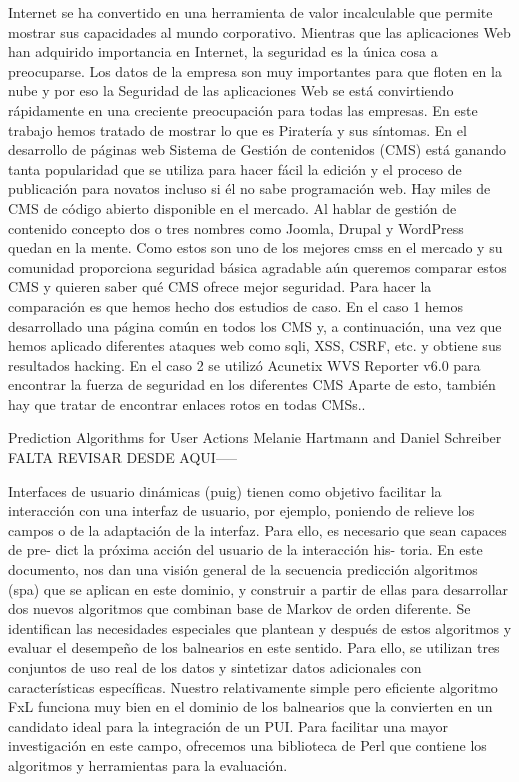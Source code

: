 Internet se ha convertido en una herramienta de  valor incalculable  que permite mostrar sus capacidades al mundo corporativo. Mientras que las aplicaciones Web han adquirido importancia en  Internet, la seguridad es la única cosa a preocuparse. Los datos de la empresa son muy importantes para que floten en la nube y por eso la Seguridad de las aplicaciones Web se está convirtiendo rápidamente en una creciente preocupación para todas las empresas. En este trabajo hemos tratado de mostrar lo que es Piratería y sus síntomas. En el desarrollo de páginas web Sistema de Gestión de contenidos (CMS) está ganando tanta popularidad que se utiliza para hacer fácil la edición y el proceso de publicación para novatos incluso si él no sabe programación web. Hay miles de CMS de código abierto disponible en el mercado. Al hablar de gestión de contenido concepto dos o tres nombres como Joomla, Drupal y WordPress quedan en la mente. Como estos son uno de los mejores cmss en el mercado y su comunidad proporciona seguridad básica agradable aún queremos comparar estos CMS y quieren saber qué CMS ofrece mejor seguridad. Para hacer la comparación es que hemos hecho dos estudios de caso. En el caso 1 hemos desarrollado una página común en todos los CMS y, a continuación, una vez que hemos aplicado diferentes ataques web como sqli, XSS, CSRF, etc. y obtiene sus resultados hacking. En el caso 2 se utilizó Acunetix WVS Reporter v6.0 para encontrar la fuerza de seguridad en los diferentes CMS Aparte de esto, también hay que tratar de encontrar enlaces rotos en todas CMSs..


Prediction Algorithms for User Actions
Melanie Hartmann and Daniel Schreiber
FALTA REVISAR DESDE AQUI-----

Interfaces de usuario dinámicas (puig) tienen como objetivo facilitar la interacción con una interfaz de usuario, por ejemplo, poniendo de relieve los campos o de la adaptación de la interfaz. Para ello, es necesario que sean capaces de pre- dict la próxima acción del usuario de la interacción his- toria. En este documento, nos dan una visión general de la secuencia predicción algoritmos (spa) que se aplican en este dominio, y construir a partir de ellas para desarrollar dos nuevos algoritmos que combinan base de Markov de orden diferente. Se identifican las necesidades especiales que plantean y después de estos algoritmos y evaluar el desempeño de los balnearios en este sentido. Para ello, se utilizan tres conjuntos de uso real de los datos y sintetizar datos adicionales con características específicas. Nuestro relativamente simple pero eficiente algoritmo FxL funciona muy bien en el dominio de los balnearios que la convierten en un candidato ideal para la integración de un PUI. Para facilitar una mayor investigación en este campo, ofrecemos una biblioteca de Perl que contiene los algoritmos y herramientas para la evaluación.


